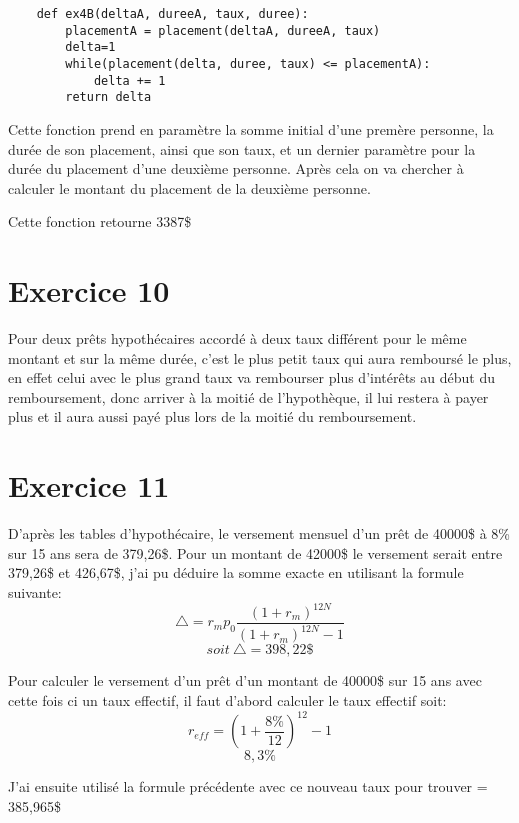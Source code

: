 \documentclass{article}
\begin{document}
\begin{DDbox}{\linewidth}
\begin{Verbatim}
    def ex4B(deltaA, dureeA, taux, duree):
        placementA = placement(deltaA, dureeA, taux)
        delta=1
        while(placement(delta, duree, taux) <= placementA):
            delta += 1
        return delta
\end{Verbatim}
\end{DDbox}

\qquad Cette fonction prend en paramètre la somme initial d'une premère personne, la durée de son placement, ainsi que son taux, et un dernier paramètre pour la durée du placement d'une deuxième personne. Après cela on va chercher à calculer le montant du placement de la deuxième personne.

\qquad Cette fonction retourne 3387\$

\section{Exercice 10}

\qquad Pour deux prêts hypothécaires accordé à deux taux différent pour le même montant et sur la même durée, c'est le plus petit taux qui aura remboursé le plus, en effet celui avec le plus grand taux va rembourser plus d'intérêts au début du remboursement, donc arriver à la moitié de l'hypothèque, il lui restera à payer plus et il aura aussi payé plus lors de la moitié du remboursement.

\section{Exercice 11}

\qquad D'après les tables d'hypothécaire, le versement mensuel d'un prêt de 40000\$ à 8\% sur 15 ans sera de 379,26\$. Pour un montant de 42000\$ le versement serait entre 379,26\$ et 426,67\$, j'ai pu déduire la somme exacte en utilisant la formule suivante:
$$ \triangle = r_mp_0 \frac{(1+r_m)^{12N}}{(1+r_m)^{12N}-1}$$
$$ soit\ \triangle = 398,22\$ $$

Pour calculer le versement d'un prêt d'un montant de 40000\$ sur 15 ans avec cette fois ci un taux effectif, il faut d'abord calculer le taux effectif soit:
$$ r_{eff} = (1+ \frac{8\%}{12})^{12}-1 $$
$$ 8,3\%$$

J'ai ensuite utilisé la formule précédente avec ce nouveau taux pour trouver \triangle = 385,965\$ 
\end{document}
